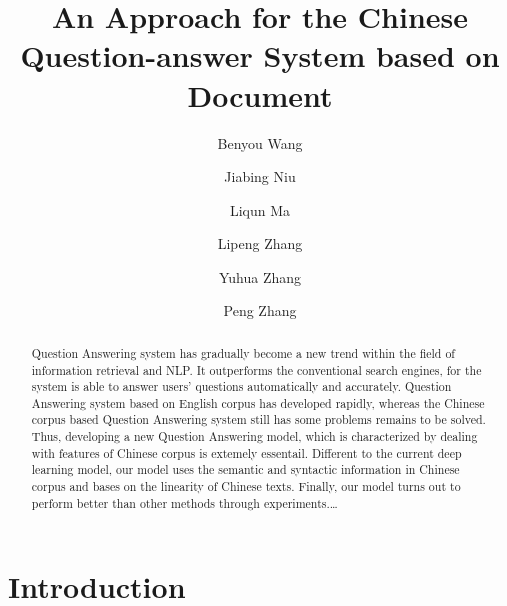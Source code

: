 \documentclass{llncs}
\begin{document}
%

\mainmatter              %
%
\title{An Approach for the Chinese Question-answer System based on Document}
%
%
\author{Benyou Wang \and Jiabing Niu \and Liqun Ma \and Lipeng Zhang \and Yuhua Zhang
\and Peng Zhang}
%
%
%



\maketitle              %

\begin{abstract}
Question Answering system has gradually become a new trend within the field of information retrieval and NLP. It outperforms the conventional search engines, for the system is able to answer users’ questions automatically and accurately. Question Answering system based on English corpus has developed rapidly, whereas the Chinese corpus based Question Answering system still has some problems remains to be solved. Thus, developing a new Question Answering model, which is characterized by dealing with features of Chinese corpus is extemely essentail. Different to the current deep learning model, our model uses the semantic and syntactic information in Chinese corpus and bases on the linearity of Chinese texts. Finally, our model turns out to perform better than other methods through experiments.\dots
{}
\end{abstract}
%
\section{Introduction}
%
\end{document}
